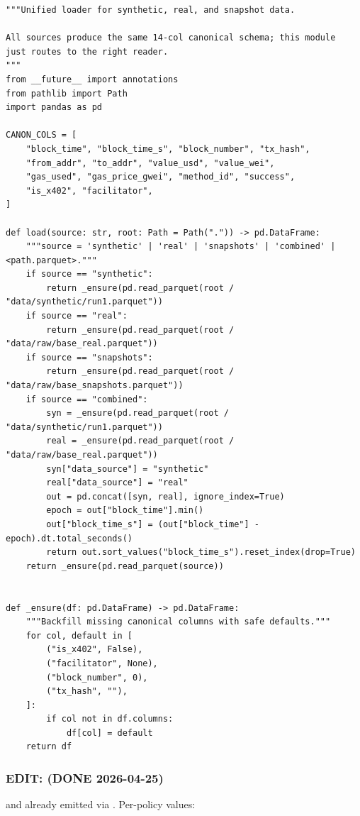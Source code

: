 \documentclass[11pt]{article}
\begin{document}
\begin{lstlisting}
"""Unified loader for synthetic, real, and snapshot data.

All sources produce the same 14-col canonical schema; this module
just routes to the right reader.
"""
from __future__ import annotations
from pathlib import Path
import pandas as pd

CANON_COLS = [
    "block_time", "block_time_s", "block_number", "tx_hash",
    "from_addr", "to_addr", "value_usd", "value_wei",
    "gas_used", "gas_price_gwei", "method_id", "success",
    "is_x402", "facilitator",
]

def load(source: str, root: Path = Path(".")) -> pd.DataFrame:
    """source = 'synthetic' | 'real' | 'snapshots' | 'combined' | <path.parquet>."""
    if source == "synthetic":
        return _ensure(pd.read_parquet(root / "data/synthetic/run1.parquet"))
    if source == "real":
        return _ensure(pd.read_parquet(root / "data/raw/base_real.parquet"))
    if source == "snapshots":
        return _ensure(pd.read_parquet(root / "data/raw/base_snapshots.parquet"))
    if source == "combined":
        syn = _ensure(pd.read_parquet(root / "data/synthetic/run1.parquet"))
        real = _ensure(pd.read_parquet(root / "data/raw/base_real.parquet"))
        syn["data_source"] = "synthetic"
        real["data_source"] = "real"
        out = pd.concat([syn, real], ignore_index=True)
        epoch = out["block_time"].min()
        out["block_time_s"] = (out["block_time"] - epoch).dt.total_seconds()
        return out.sort_values("block_time_s").reset_index(drop=True)
    return _ensure(pd.read_parquet(source))


def _ensure(df: pd.DataFrame) -> pd.DataFrame:
    """Backfill missing canonical columns with safe defaults."""
    for col, default in [
        ("is_x402", False),
        ("facilitator", None),
        ("block_number", 0),
        ("tx_hash", ""),
    ]:
        if col not in df.columns:
            df[col] = default
    return df
\end{lstlisting}
\subsubsection*{EDIT:  (DONE 2026-04-25)}
 and  already emitted via . Per-policy values:
\end{document}
